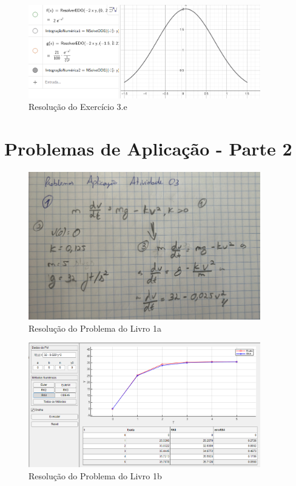 \begin{figure}[H]
    \centering
    \includegraphics[width=0.9\textwidth]{Fotos/1farol3e}
    \caption{Resolução do Exercício 3.e}
    \label{fig:1farol3e}
\end{figure}


\section*{Problemas de Aplicação - Parte 2}

\begin{figure}[H]
    \centering
    \includegraphics[width=0.9\textwidth]{Fotos/2app1a}
    \caption{Resolução do Problema do Livro 1a}
    \label{fig:2app1a}
\end{figure}

\begin{figure}[H]
    \centering
    \includegraphics[width=0.9\textwidth]{Fotos/2app1b}
    \caption{Resolução do Problema do Livro 1b}
    \label{fig:2app1b}
\end{figure}

